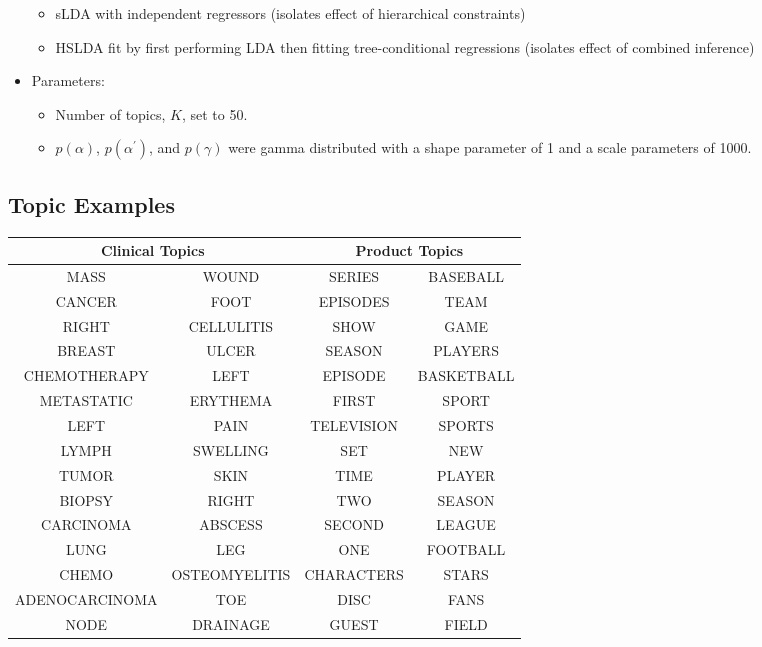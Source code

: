 \documentclass[portrait]{sciposter}
\begin{document}
\begin{multicols}{3}
\begin{itemize}
\begin{itemize}
\item sLDA with independent regressors (isolates effect of hierarchical constraints)
\item HSLDA fit by first performing LDA then fitting tree-conditional regressions (isolates effect of combined inference)
\end{itemize}
\item Parameters:
\begin{itemize}
\item Number of topics, $K$, set to 50.
\item $p\left(\alpha\right)$, $p\left(\alpha^{\prime}\right)$, and $p\left(\gamma\right)$ were gamma distributed with a shape parameter of 1 and a scale parameters of 1000. 
\end{itemize}
\end{itemize}



\subsection{Topic Examples}


\begin{small}
\begin{tabular}{|c|c||c|c|}
\hline
\multicolumn{2}{|c||}{\textbf{Clinical Topics}} &
\multicolumn{2}{|c|}{\textbf{Product Topics}} \\ \hline
MASS & WOUND & SERIES & BASEBALL \\
\hline
CANCER & FOOT & EPISODES & TEAM \\
\hline
RIGHT & CELLULITIS & SHOW & GAME \\
\hline
BREAST & ULCER & SEASON & PLAYERS \\
\hline
CHEMOTHERAPY & LEFT & EPISODE & BASKETBALL \\
\hline
METASTATIC & ERYTHEMA & FIRST & SPORT \\
\hline
LEFT & PAIN & TELEVISION & SPORTS \\
\hline
LYMPH & SWELLING & SET & NEW \\
\hline
TUMOR & SKIN & TIME & PLAYER \\
\hline
BIOPSY & RIGHT & TWO & SEASON \\
\hline
CARCINOMA & ABSCESS & SECOND & LEAGUE \\
\hline
LUNG & LEG & ONE & FOOTBALL \\
\hline
CHEMO & OSTEOMYELITIS & CHARACTERS & STARS \\
\hline
ADENOCARCINOMA & TOE & DISC & FANS \\
\hline
NODE & DRAINAGE & GUEST & FIELD \\
\hline
\end{tabular}
\end{small}



\end{multicols}
\end{document}

